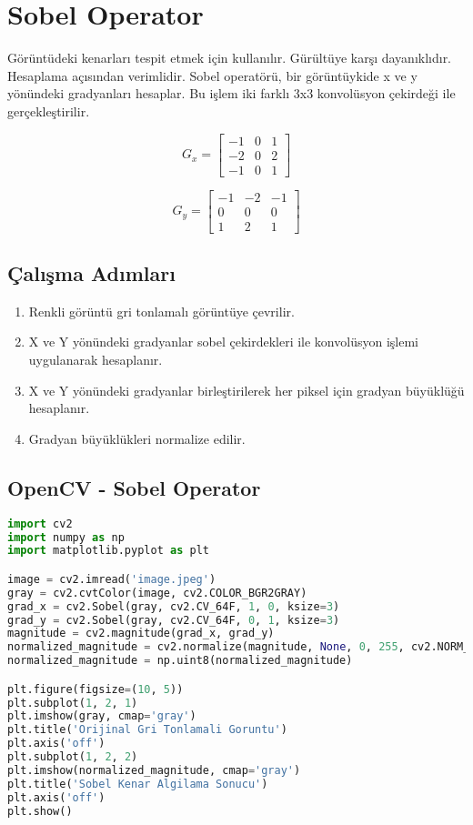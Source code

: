 \section{Sobel Operator}

Görüntüdeki kenarları tespit etmek için kullanılır. Gürültüye karşı dayanıklıdır. Hesaplama açısından verimlidir. Sobel operatörü, bir görüntüykide x ve y yönündeki gradyanları hesaplar. Bu işlem iki farklı 3x3 konvolüsyon çekirdeği ile gerçekleştirilir.

\[
G_x = \begin{bmatrix}
-1 & 0 & 1 \\
-2 & 0 & 2 \\
-1 & 0 & 1
\end{bmatrix}
\]

\[
G_y = \begin{bmatrix}
-1 & -2 & -1 \\
0 & 0 & 0 \\
1 & 2 & 1
\end{bmatrix}
\]

\subsection{Çalışma Adımları}
\begin{enumerate}
	\item Renkli görüntü gri tonlamalı görüntüye çevrilir.
	\item X ve Y yönündeki gradyanlar sobel çekirdekleri ile konvolüsyon işlemi uygulanarak hesaplanır.
	\item X ve Y yönündeki gradyanlar birleştirilerek her piksel için gradyan büyüklüğü hesaplanır.
	\item Gradyan büyüklükleri normalize edilir.
\end{enumerate}

\subsection{OpenCV - Sobel Operator}
\begin{lstlisting}[language=Python]
import cv2
import numpy as np
import matplotlib.pyplot as plt

image = cv2.imread('image.jpeg')
gray = cv2.cvtColor(image, cv2.COLOR_BGR2GRAY)
grad_x = cv2.Sobel(gray, cv2.CV_64F, 1, 0, ksize=3)
grad_y = cv2.Sobel(gray, cv2.CV_64F, 0, 1, ksize=3)
magnitude = cv2.magnitude(grad_x, grad_y)
normalized_magnitude = cv2.normalize(magnitude, None, 0, 255, cv2.NORM_MINMAX)
normalized_magnitude = np.uint8(normalized_magnitude)

plt.figure(figsize=(10, 5))
plt.subplot(1, 2, 1)
plt.imshow(gray, cmap='gray')
plt.title('Orijinal Gri Tonlamali Goruntu')
plt.axis('off')
plt.subplot(1, 2, 2)
plt.imshow(normalized_magnitude, cmap='gray')
plt.title('Sobel Kenar Algilama Sonucu')
plt.axis('off')
plt.show()
\end{lstlisting}

\newpage